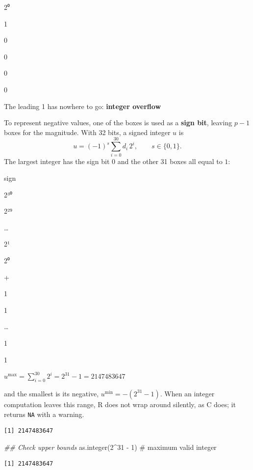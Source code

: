 \documentclass[
  letterpaper,
  DIV=11,
  numbers=noendperiod]{scrreprt}
\newenvironment{Shaded}{\begin{snugshade}}{\end{snugshade}}
\newcommand{\CommentTok}[1]{\textcolor[rgb]{0.37,0.37,0.37}{#1}}
\newcommand{\DecValTok}[1]{\textcolor[rgb]{0.68,0.00,0.00}{#1}}
\newcommand{\DocumentationTok}[1]{\textcolor[rgb]{0.37,0.37,0.37}{\textit{#1}}}
\newcommand{\FunctionTok}[1]{\textcolor[rgb]{0.28,0.35,0.67}{#1}}
\newcommand{\NormalTok}[1]{\textcolor[rgb]{0.00,0.23,0.31}{#1}}
\newcommand{\SpecialCharTok}[1]{\textcolor[rgb]{0.37,0.37,0.37}{#1}}
\begin{document}
2⁰

1

0

0

0

0

The leading 1 has nowhere to go: \textbf{integer overflow}

To represent negative values, one of the boxes is used as a \textbf{sign
bit}, leaving \(p-1\) boxes for the magnitude. With 32 bits, a signed
integer \(u\) is \[
u = (-1)^{s}\sum_{i=0}^{30} d_i\,2^i, \qquad s\in\{0,1\}.
\] The largest integer has the sign bit \(0\) and the other 31 boxes all
equal to \(1\):

sign

2³⁰

2²⁹

\ldots{}

2¹

2⁰

+

1

1

\ldots{}

1

1

\(u^{\max} = \sum_{i=0}^{30} 2^i = 2^{31}-1 = 2147483647\)

and the smallest is its negative, \(u^{\min} = -(2^{31}-1)\). When an
integer computation leaves this range, R does not wrap around silently,
as C does; it returns \texttt{NA} with a warning.

\begin{Shaded}
\end{Shaded}

\begin{verbatim}
[1] 2147483647
\end{verbatim}

\begin{Shaded}
\begin{Highlighting}[]
\DocumentationTok{\#\# Check upper bounds}
\FunctionTok{as.integer}\NormalTok{(}\DecValTok{2}\SpecialCharTok{\^{}}\DecValTok{31} \SpecialCharTok{{-}} \DecValTok{1}\NormalTok{)                    }\CommentTok{\# maximum valid integer}
\end{Highlighting}
\end{Shaded}

\begin{verbatim}
[1] 2147483647
\end{verbatim}
\end{document}
